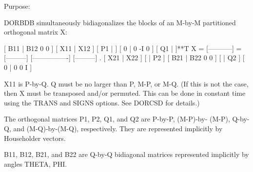  \begin{DoxyParagraph}{Purpose\+: }
\begin{DoxyVerb} DORBDB simultaneously bidiagonalizes the blocks of an M-by-M
 partitioned orthogonal matrix X:

                                 [ B11 | B12 0  0 ]
     [ X11 | X12 ]   [ P1 |    ] [  0  |  0 -I  0 ] [ Q1 |    ]**T
 X = [-----------] = [---------] [----------------] [---------]   .
     [ X21 | X22 ]   [    | P2 ] [ B21 | B22 0  0 ] [    | Q2 ]
                                 [  0  |  0  0  I ]

 X11 is P-by-Q. Q must be no larger than P, M-P, or M-Q. (If this is
 not the case, then X must be transposed and/or permuted. This can be
 done in constant time using the TRANS and SIGNS options. See DORCSD
 for details.)

 The orthogonal matrices P1, P2, Q1, and Q2 are P-by-P, (M-P)-by-
 (M-P), Q-by-Q, and (M-Q)-by-(M-Q), respectively. They are
 represented implicitly by Householder vectors.

 B11, B12, B21, and B22 are Q-by-Q bidiagonal matrices represented
 implicitly by angles THETA, PHI.\end{DoxyVerb}
 
\end{DoxyParagraph}

